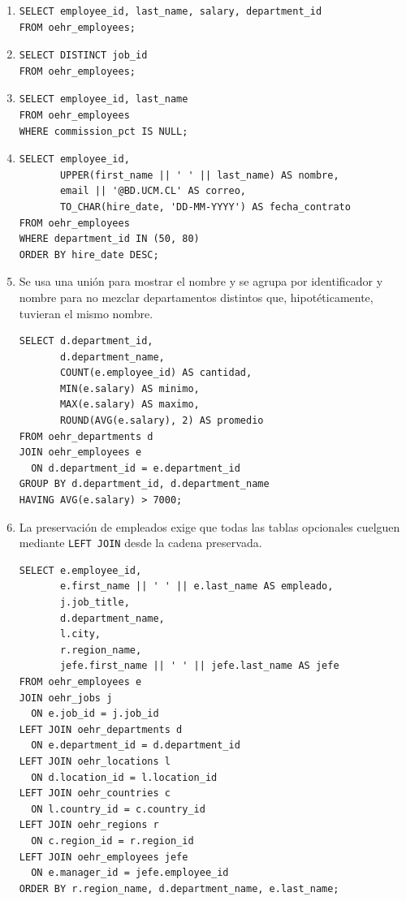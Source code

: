 \documentclass[11pt,a4paper]{article}
\newcommand{\campo}[1]{\texttt{#1}}
\begin{document}
\begin{enumerate}[label=\textbf{S.\arabic*}]
  \item
\begin{lstlisting}
SELECT employee_id, last_name, salary, department_id
FROM oehr_employees;
\end{lstlisting}
  \item
\begin{lstlisting}
SELECT DISTINCT job_id
FROM oehr_employees;
\end{lstlisting}
  \item
\begin{lstlisting}
SELECT employee_id, last_name
FROM oehr_employees
WHERE commission_pct IS NULL;
\end{lstlisting}
  \item
\begin{lstlisting}
SELECT employee_id,
       UPPER(first_name || ' ' || last_name) AS nombre,
       email || '@BD.UCM.CL' AS correo,
       TO_CHAR(hire_date, 'DD-MM-YYYY') AS fecha_contrato
FROM oehr_employees
WHERE department_id IN (50, 80)
ORDER BY hire_date DESC;
\end{lstlisting}
  \item Se usa una unión para mostrar el nombre y se agrupa por identificador y nombre para no
  mezclar departamentos distintos que, hipotéticamente, tuvieran el mismo nombre.
\begin{lstlisting}
SELECT d.department_id,
       d.department_name,
       COUNT(e.employee_id) AS cantidad,
       MIN(e.salary) AS minimo,
       MAX(e.salary) AS maximo,
       ROUND(AVG(e.salary), 2) AS promedio
FROM oehr_departments d
JOIN oehr_employees e
  ON d.department_id = e.department_id
GROUP BY d.department_id, d.department_name
HAVING AVG(e.salary) > 7000;
\end{lstlisting}
  \item La preservación de empleados exige que todas las tablas opcionales cuelguen mediante
  \campo{LEFT JOIN} desde la cadena preservada.
\begin{lstlisting}
SELECT e.employee_id,
       e.first_name || ' ' || e.last_name AS empleado,
       j.job_title,
       d.department_name,
       l.city,
       r.region_name,
       jefe.first_name || ' ' || jefe.last_name AS jefe
FROM oehr_employees e
JOIN oehr_jobs j
  ON e.job_id = j.job_id
LEFT JOIN oehr_departments d
  ON e.department_id = d.department_id
LEFT JOIN oehr_locations l
  ON d.location_id = l.location_id
LEFT JOIN oehr_countries c
  ON l.country_id = c.country_id
LEFT JOIN oehr_regions r
  ON c.region_id = r.region_id
LEFT JOIN oehr_employees jefe
  ON e.manager_id = jefe.employee_id
ORDER BY r.region_name, d.department_name, e.last_name;
\end{lstlisting}
\end{enumerate}
\end{document}
